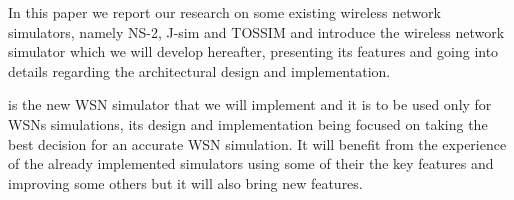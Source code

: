 In this paper we report our research on some existing wireless network
simulators, namely NS-2, J-sim and TOSSIM and introduce \codename the 
wireless network simulator which we will develop hereafter, presenting its 
features and going into details regarding the architectural design and implementation.

\codename is the new WSN simulator that we will implement and it is to be used only 
for WSNs simulations, its design and
implementation being focused on taking the best decision for an accurate WSN
simulation. It will benefit from the experience of the already implemented
simulators using some of their the key features and improving some others but
it will also bring new features.

